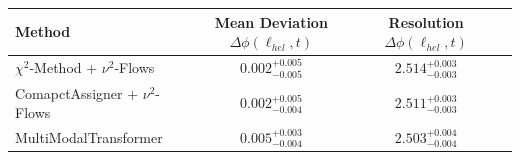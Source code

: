     \begin{tabular}{lccc}
        \toprule
        Method & Mean Deviation $\Delta\phi(\ell_{hel}, t)$ & Resolution $\Delta\phi(\ell_{hel}, t)$ \\
        \midrule
        $\chi^2$-Method + $\nu^2$-Flows & $0.002^{+0.005}_{-0.005}$ & $2.514^{+0.003}_{-0.003}$ \\
        ComapctAssigner + $\nu^2$-Flows & $0.002^{+0.005}_{-0.004}$ & $2.511^{+0.003}_{-0.003}$ \\
        MultiModalTransformer & $0.005^{+0.003}_{-0.004}$ & $2.503^{+0.004}_{-0.004}$ \\
        \bottomrule
    \end{tabular}